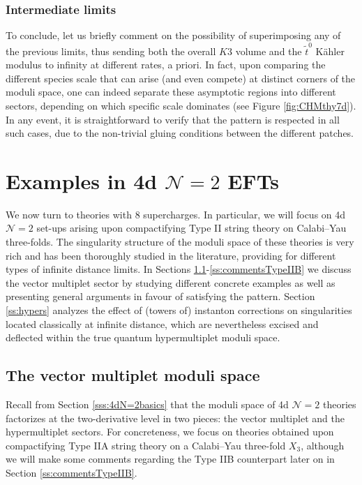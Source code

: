 \subsubsection*{Intermediate limits}
	
To conclude, let us briefly comment on the possibility of superimposing any of the previous limits, thus sending both the overall $K3$ volume and the $\tilde{t}^0$ K\"ahler modulus to infinity at different rates, a priori. In fact, upon comparing the different species scale that can arise (and even compete) at distinct corners of the moduli space, one can indeed separate these asymptotic regions into different sectors, depending on which specific scale dominates (see Figure \ref{fig:CHMthy7d}). In any event, it is straightforward to verify that the pattern is respected in all such cases, due to the non-trivial gluing conditions between the different patches.

\section{Examples in 4d $\mathcal{N}=2$ EFTs}
\label{s:8supercharges}
	
We now turn to theories with 8 supercharges. In particular, we will focus on 4d $\mathcal{N}=2$ set-ups arising upon compactifying Type II string theory on Calabi--Yau three-folds. The singularity structure of the moduli space of these theories is very rich and has been thoroughly studied in the literature, providing for different types of infinite distance limits. In Sections \ref{ss:preliminary}-\ref{ss:commentsTypeIIB} we discuss the vector multiplet sector by studying different concrete examples as well as presenting general arguments in favour of satisfying the pattern. Section \ref{ss:hypers} analyzes the effect of (towers of) instanton corrections on singularities located classically at infinite distance, which are nevertheless excised and deflected within the true quantum hypermultiplet moduli space.
	
\subsection{The vector multiplet moduli space}
\label{ss:preliminary}
	
Recall from Section \ref{sss:4dN=2basics} that the moduli space of 4d $\mathcal{N}=2$ theories factorizes at the two-derivative level in two pieces: the vector multiplet and the hypermultiplet sectors. For concreteness, we focus on theories obtained upon compactifying Type IIA string theory on a Calabi--Yau three-fold $X_3$, although we will make some comments regarding the Type IIB counterpart later on in Section \ref{ss:commentsTypeIIB}.

